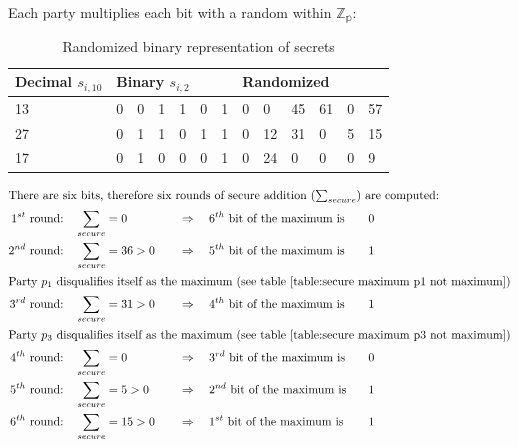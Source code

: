 		Each party multiplies each bit with a random within $\mathbb{Z_p}$:
		
		\begin{table}[!htb]
			\centering
			\caption{Randomized binary representation of secrets}
			\label{table:secure maximum randomized binary representation}
			\begin{tabular}{|l|l|l|l|l|l|l|l|l|l|l|l|l|}
				\hline
				Decimal $s_{i,10}$ & \multicolumn{6}{l|}{Binary $s_{i,2}$}  & \multicolumn{6}{l|}{Randomized} \\ \hline
				13                 & 0    & 0    & 1    & 1    & 0   & 1 & 0    & 0    & 45    & 61    & 0   & 57   \\ \hline
				27                 & 0    & 1    & 1    & 0    & 1   & 1 & 0    & 12    & 31    & 0    & 5   & 15   \\ \hline
				17                 & 0    & 1    & 0    & 0    & 0   & 1 & 0    & 24    & 0    & 0    & 0   & 9   \\ \hline
			\end{tabular}
		\end{table}
				
		\begin{alignat}{3}
			\intertext{There are six bits, therefore six rounds of secure addition ($\sum_{secure}$) are computed:}
			1^{st} \ \text{round:} \quad & \sum_{secure}=0 && \Rightarrow \quad 6^{th} \ \text{bit of the maximum is} && 0 \nonumber \\
			2^{nd} \ \text{round:} \quad &\sum_{secure}=36 > 0 \quad && \Rightarrow \quad 5^{th} \ \text{bit of the maximum is} \quad && 1 \nonumber \\
			\intertext{Party $p_1$ disqualifies itself as the maximum (see table \ref{table:secure maximum p1 not maximum})}
			3^{rd} \ \text{round:} \quad &\sum_{secure}=31 > 0 && \Rightarrow \quad 4^{th} \ \text{bit of the maximum is} && 1 \nonumber \\
			\intertext{Party $p_3$ disqualifies itself as the maximum (see table \ref{table:secure maximum p3 not maximum})}
			4^{th} \ \text{round:} \quad &\sum_{secure}=0 && \Rightarrow \quad 3^{rd} \ \text{bit of the maximum is} && 0 \nonumber \\
			5^{th} \ \text{round:} \quad &\sum_{secure}=5>0 && \Rightarrow \quad 2^{nd} \ \text{bit of the maximum is} && 1 \nonumber \\
			6^{th} \ \text{round:} \quad &\sum_{secure}=15>0 && \Rightarrow \quad 1^{st} \ \text{bit of the maximum is} && 1 \nonumber
		\end{alignat}

